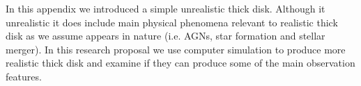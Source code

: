 \documentclass[a4paper,12pt,modern]{aastex62}
\begin{document}
In this appendix we introduced a simple unrealistic thick disk. Although it unrealistic it does include main physical phenomena relevant to realistic thick disk as we assume appears in nature (i.e. AGNs, star formation and stellar merger).
In this research proposal we use computer simulation to produce more realistic thick disk and examine if they can produce some of the main observation features.

\hrulefill

\newpage


\end{document}

